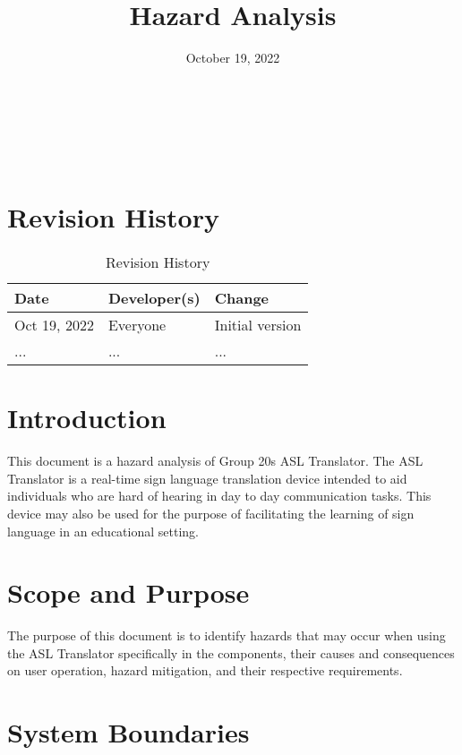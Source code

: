 \documentclass{article}
\title{Hazard Analysis\\\progname}
\author{\authname}
\date{October 19, 2022}
\begin{document}
\maketitle

~\newpage

\tableofcontents

~\newpage

\section*{Revision History}
\begin{table}[hp]
\caption{Revision History} \label{TblRevisionHistory}
\begin{tabularx}{\textwidth}{llX}
\toprule
\textbf{Date} & \textbf{Developer(s)} & \textbf{Change}\\
\midrule
Oct 19, 2022 & Everyone & Initial version\\

... & ... & ...\\
\bottomrule
\end{tabularx}
\end{table}

\newpage
\textheight 9in

\section{Introduction}

This document is a hazard analysis of Group 20\textquotesingle s ASL Translator. The ASL Translator is a real-time sign language translation device intended to aid 
individuals who are hard of hearing in day to day communication tasks. This device may also be used for the purpose of facilitating the learning of 
sign language in an educational setting.\\

\section{Scope and Purpose}

The purpose of this document is to identify hazards that may occur when using the ASL Translator specifically in the components, their causes and consequences on user 
operation, hazard mitigation, and their respective requirements.\\

\section{System Boundaries}
\end{document}
